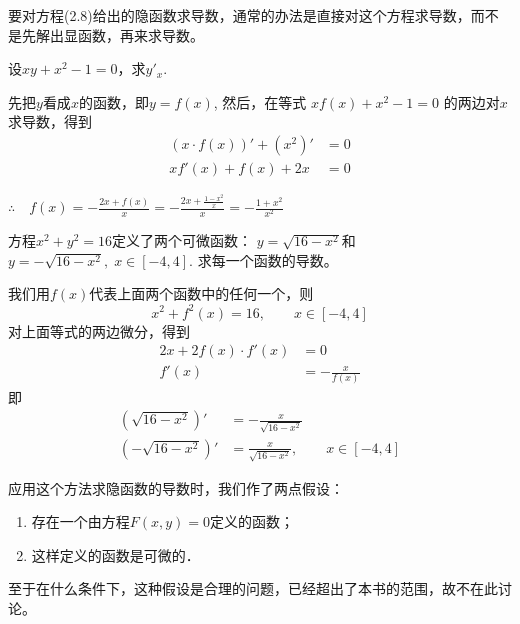 要对方程(2.8)给出的隐函数求导数，通常的办法是直接对这个方程求导数，而不是先解出显函数，再来求导数。


\begin{example}
设$xy+x^2-1=0$，求$y'_x$.
\end{example}

\begin{solution}
先把$y$看成$x$的函数，即$y=f(x)$, 然后，在等式
$xf (x) +x^2-1=0$
的两边对$x$求导数，得到
\[\begin{split}
    (x\cdot f(x))'+(x^2)'&=0\\
xf'(x)+f(x)+2x&=0
\end{split}\]

$\therefore\quad f (x) =-\frac{2x+f (x)}{x}=-\frac{2x+\frac{1-x^2}{x}}{x}=-\frac{1+x^2}{x^2}$    
\end{solution}

\begin{example}
    方程$x^2+y^2=16$定义了两个可微函数：
$y=\sqrt{16-x^2}$和$y=-\sqrt{16-x^2},\; x\in [-4, 4]$. 求每一个函数的导数。
\end{example}


\begin{solution}
    我们用$f(x)$代表上面两个函数中的任何一个，则
\[x^2+f^2 (x) =16,\qquad  x\in  [-4, 4] \]
对上面等式的两边微分，得到
\[\begin{split}
    2x+2f (x) \cdot f' (x) &=0\\
    f'(x)&=-\frac{x}{f(x)}
\end{split} \]
即
\[\begin{split}
    \left(\sqrt{16-x^2}\right)'&=-\frac{x}{\sqrt{16-x^2}}\\
    \left(-\sqrt{16-x^2}\right)'&=\frac{x}{\sqrt{16-x^2}},\qquad x\in[-4,4]
\end{split}\]
\end{solution}

\begin{rmk}
应用这个方法求隐函数的导数时，我们作了两点假设：
\begin{enumerate}
    \item 存在一个由方程$F(x,y)=0$定义的函数；
    \item 这样定义的函数是可微的．
\end{enumerate} 
至于在什么条件下，这种假设是合理的问题，已经超出了本书的范围，故不在此讨论。
\end{rmk}









